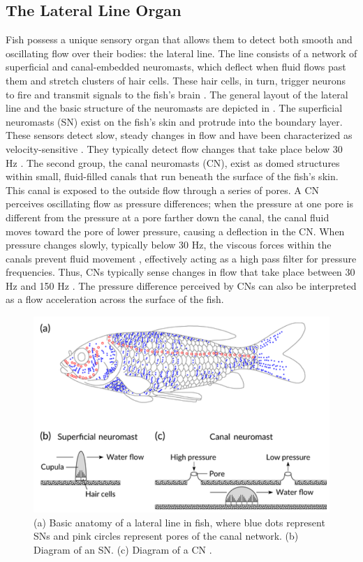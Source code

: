 \subsection{The Lateral Line Organ} \label{The Lateral Line Organ}

	Fish possess a unique sensory organ that allows them to detect both smooth and oscillating flow over their bodies: the lateral line. The line consists of a network of superficial and canal-embedded neuromasts, which deflect when fluid flows past them and stretch clusters of hair cells. These hair cells, in turn, trigger neurons to fire and transmit signals to the fish’s brain \citep{Dijkgraaf1962}. The general layout of the lateral line and the basic structure of the neuromasts are depicted in . The superficial neuromasts (SN) exist on the fish’s skin and protrude into the boundary layer. These sensors detect slow, steady changes in flow and have been characterized as velocity-sensitive \citep{Montgomery2001}. They typically detect flow changes that take place below 30 Hz \citep{Coombs2001}. The second group, the canal neuromasts (CN), exist as domed structures within small, fluid-filled canals that run beneath the surface of the fish’s skin. This canal is exposed to the outside flow through a series of pores. A CN perceives oscillating flow as pressure differences; when the pressure at one pore is different from the pressure at a pore farther down the canal, the canal fluid moves toward the pore of lower pressure, causing a deflection in the CN. When pressure changes slowly, typically below 30 Hz, the viscous forces within the canals prevent fluid movement \citep{Denton1989}, effectively acting as a high pass filter for pressure frequencies. Thus, CNs typically sense changes in flow that take place between 30 Hz and 150 Hz \citep{Coombs2001}. The pressure difference perceived by CNs can also be interpreted as a flow acceleration across the surface of the fish.
	
\begin{figure}
\begin{center}
\includegraphics[width=0.49\columnwidth]{figures/Figure3.png}
\end{center}
\caption{(a) Basic anatomy of a lateral line in fish, where blue dots represent SNs and pink circles represent pores of the canal network. (b) Diagram of an SN. (c) Diagram of a CN \citep{Mogdans2018}.}
\label{fig:app:Lat Line}
\end{figure}

